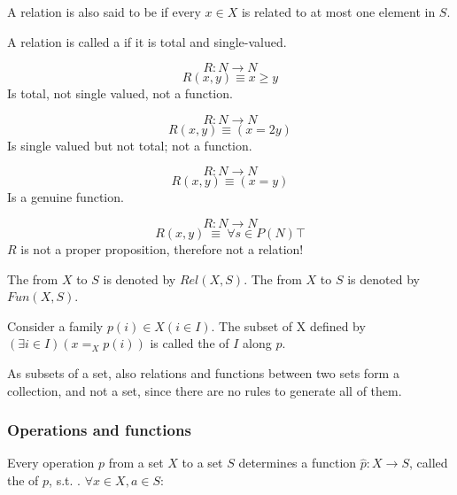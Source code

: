 A relation is also said to be  if every
\(x \in X\) is related to at most one element in $S$.

A relation is called a  if it is total and single-valued.

\begin{example}
  \[ R : N \rightarrow N \]
  \[ R(x,y) \equiv  x \geq y \] 
  Is total, not single valued, not a function.
\end{example}

\begin{example}
  \[ R : N \rightarrow N \]
  \[ R(x,y) \equiv (x = 2y) \]
  Is single valued but not total; not a function.
\end{example}

\begin{example}
  \[ R : N \rightarrow N \]
  \[ R(x,y) \equiv (x = y) \]
  Is a genuine function.
\end{example}

\begin{example}
  \[ R : N \rightarrow N \]
  \[ R(x,y)\ \equiv\ \forall s \in P(N) \top \]
  $R$ is not a proper proposition, therefore not a relation!
\end{example}


The  from $X$ to $S$ is denoted by
$Rel(X, S)$.  The  from \(X\) to
\(S\) is denoted by \(Fun(X, S)\).

Consider a family \(p(i) \in X (i \in I)\).  The subset of X defined
by \((\exists i \in I)(x =_X p(i))\) is called the  of
\(I\) along \(p\).

As subsets of a set, also relations and functions between two sets
form a collection, and not a set, since there are no rules to
generate all of them.

\subsubsection{Operations and functions}

Every operation \(p\) from a set \(X\) to a set \(S\) determines a
function \(\hat{p} : X \rightarrow S\), called the  of
\(p\), s.t. .  $\forall x \in X, a \in S$:

